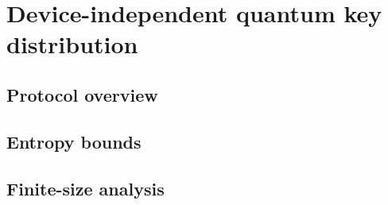 \chapter{Device-independent quantum key distribution}

\section{Protocol overview}

\section{Entropy bounds}

\section{Finite-size analysis}
